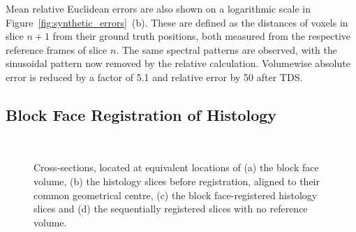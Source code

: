   Mean relative Euclidean errors are also shown on a logarithmic scale in Figure~\ref{fig:synthetic_errors}~(b). These are defined as the distances of voxels in slice $n+1$ from their ground truth positions, both measured from the respective reference frames of slice $n$. The same spectral patterns are observed, with the sinusoidal pattern now removed by the relative calculation. Volumewise absolute error is reduced by a factor of 5.1 and relative error by 50 after TDS.

  \subsection{Block Face Registration of Histology} %
  \label{sub:block_face_registration_of_histology}
  \begin{figure}[!t]
    \centering
    \\
    \caption{Cross-sections, located at equivalent locations of (a) the block face volume, (b) the histology slices before registration, aligned to their common geometrical centre, (c) the block face-registered histology slices and (d) the sequentially registered slices with no reference volume.}
    \label{fig:block_face_registration}
  \end{figure}
